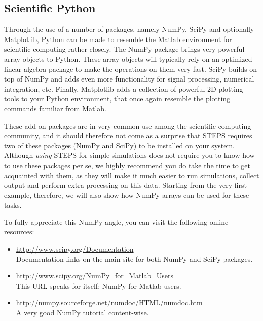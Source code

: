 \documentclass[a4paper,12pt]{book}
\begin{document}
\subsection{Scientific Python}

Through the use of a number of packages, namely NumPy, SciPy and optionally Matplotlib, Python can be made to resemble the Matlab environment for scientific computing rather closely. The NumPy package brings very powerful array objects to Python. These array objects will typically rely on an optimized linear algebra package to make the operations on them very fast. SciPy builds on top of NumPy and adds even more functionality for signal processing, numerical integration, etc. Finally, Matplotlib adds a collection of powerful 2D plotting tools to your Python environment, that once again resemble the plotting commands familiar from Matlab.

These add-on packages are in very common use among the scientific computing community, and it should therefore not come as a surprise that STEPS requires two of these packages (NumPy and SciPy) to be installed on your system. Although \emph{using} STEPS for simple simulations does not require you to know how to use these packages per se, we highly recommend you do take the time to get acquainted with them, as they will make it much easier to run simulations, collect output and perform extra processing on this data. Starting from the very first example, therefore, we will also show how NumPy arrays can be used for these tasks.

To fully appreciate this NumPy angle, you can visit the following online resources:

\begin{itemize}

\item
\url{http://www.scipy.org/Documentation}\\
Documentation links on the main site for both NumPy and SciPy packages.

\item
\url{http://www.scipy.org/NumPy_for_Matlab_Users}\\
This URL speaks for itself: NumPy for Matlab users.

\item
\url{http://numpy.sourceforge.net/numdoc/HTML/numdoc.htm}\\
A very good NumPy tutorial content-wise.

\end{itemize}
\end{document}
